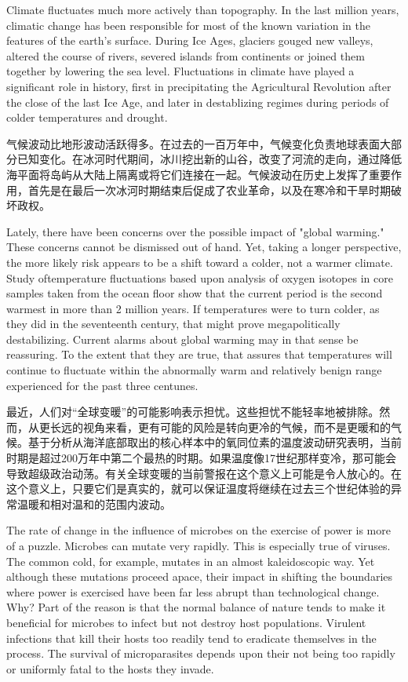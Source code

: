 \begin{Parallel}{97mm}{45mm}
  \ParallelLText
  {Climate fluctuates much more actively than topography. In the last million years, climatic change has been responsible for most of the known variation in the features of the earth's surface. During Ice Ages, glaciers gouged new valleys, altered the course of rivers, severed islands from continents or joined them together by lowering the sea level. Fluctuations in climate have played a significant role in history, first in precipitating the Agricultural Revolution after the close of the last Ice Age, and later in destablizing regimes during periods of colder temperatures and drought.}
  
  \ParallelRText
  {气候波动比地形波动活跃得多。在过去的一百万年中，气候变化负责地球表面大部分已知变化。在冰河时代期间，冰川挖出新的山谷，改变了河流的走向，通过降低海平面将岛屿从大陆上隔离或将它们连接在一起。气候波动在历史上发挥了重要作用，首先是在最后一次冰河时期结束后促成了农业革命，以及在寒冷和干旱时期破坏政权。}
  \ParallelPar


  \ParallelLText
  {Lately, there have been concerns over the possible impact of "global warming." These concerns cannot be dismissed out of hand. Yet, taking a longer perspective, the more likely risk appears to be a shift toward a colder, not a warmer climate. Study oftemperature fluctuations based upon analysis of oxygen isotopes in core samples taken from the ocean floor show that the current period is the second warmest in more than 2 million years. If temperatures were to turn colder, as they did in the seventeenth century, that might prove megapolitically destabilizing. Current alarms about global warming may in that sense be reassuring. To the extent that they are true, that assures that temperatures will continue to fluctuate within the abnormally warm and relatively benign range experienced for the past three centunes.}
  
  \ParallelRText
  {最近，人们对“全球变暖”的可能影响表示担忧。这些担忧不能轻率地被排除。然而，从更长远的视角来看，更有可能的风险是转向更冷的气候，而不是更暖和的气候。基于分析从海洋底部取出的核心样本中的氧同位素的温度波动研究表明，当前时期是超过200万年中第二个最热的时期。如果温度像17世纪那样变冷，那可能会导致超级政治动荡。有关全球变暖的当前警报在这个意义上可能是令人放心的。在这个意义上，只要它们是真实的，就可以保证温度将继续在过去三个世纪体验的异常温暖和相对温和的范围内波动。}
  \ParallelPar



  \ParallelLText
  {The rate of change in the influence of microbes on the exercise of power is more of a puzzle. Microbes can mutate very rapidly. This is especially true of viruses. The common cold, for example, mutates in an almost kaleidoscopic way. Yet although these mutations proceed apace, their impact in shifting the boundaries where power is exercised have been far less abrupt than technological change. Why? Part of the reason is that the normal balance of nature tends to make it beneficial for microbes to infect but not destroy host populations. Virulent infections that kill their hosts too readily tend to eradicate themselves in the process. The survival of microparasites depends upon their not being too rapidly or uniformly fatal to the hosts they invade.}
  

\end{Parallel}

